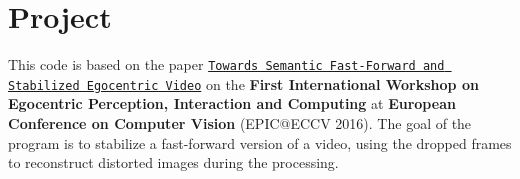 \hypertarget{index_project_sec}{}\section{Project}\label{index_project_sec}
This code is based on the paper \href{http://www.verlab.dcc.ufmg.br/wp-content/uploads/2016/10/Final_Draft_ECCVW_2016_Towards_Semantic_Fast_Forward_and_Stabilied_Egocentric_Videos.pdf}{\tt Towards Semantic Fast-\/\+Forward and Stabilized Egocentric Video} on the {\bfseries First International Workshop on Egocentric Perception, Interaction and Computing} at {\bfseries European Conference on Computer Vision} (E\+P\+IC@E\+C\+CV 2016). The goal of the program is to stabilize a fast-\/forward version of a video, using the dropped frames to reconstruct distorted images during the processing.

